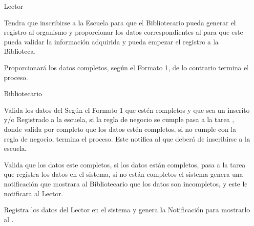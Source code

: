 \begin{PDescripcion}

  \Ppaso Lector

    \begin{enumerate}

      \Ppaso[\itarea] Tendra que inscribirse a la Escuela para que el Bibliotecario pueda generar el registro al organismo y proporcionar los datos correspondientes al  para que este pueda validar la información adquirida y pueda empezar el registro a la Biblioteca. 

\Ppaso[\itarea]  Proporcionará los datos completos, según el Formato 1, de lo contrario termina el proceso.

	

    \end{enumerate}
    
    
  \Ppaso Bibliotecario 

    \begin{enumerate}

      \Ppaso[\itarea]  Valida los datos del  Según el Formato 1 que estén completos y que sea un  inscrito y/o Registrado a la escuela, si la regla de negocio se cumple pasa a la tarea , donde valida por completo que los datos estén completos, si no cumple con la regla de negocio, termina el proceso. Este notifica al  que deberá de inscribirse a la escuela.



      \Ppaso[\itarea]  Valida que los datos este completos, si los datos están completos, pasa a la tarea  que registra los datos en el sistema, si no están completos el sistema genera una notificación que mostrara al Bibliotecario que los datos son incompletos, y este le notificara al Lector.
      
      \Ppaso[\itarea] Registra los datos del Lector en el sistema y genera la Notificación  para mostrarlo al .
     

          \end{enumerate}

\end{PDescripcion}


